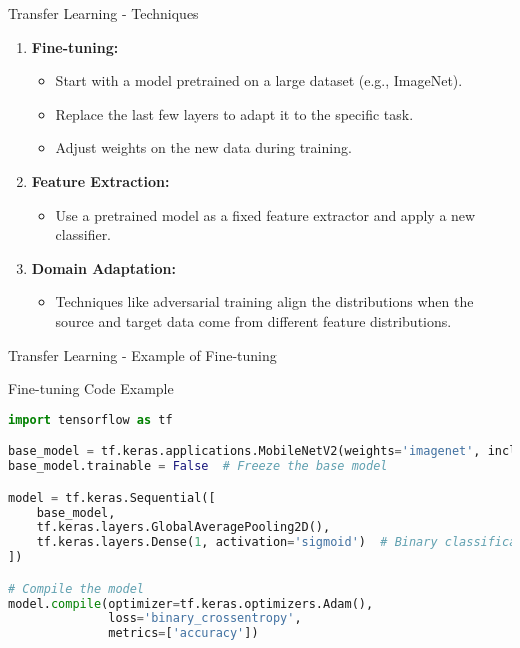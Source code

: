 \documentclass[aspectratio=169]{beamer}
\begin{document}
\begin{frame}[fragile]{Transfer Learning - Techniques}
    \begin{enumerate}
        \item \textbf{Fine-tuning:}
        \begin{itemize}
            \item Start with a model pretrained on a large dataset (e.g., ImageNet).
            \item Replace the last few layers to adapt it to the specific task.
            \item Adjust weights on the new data during training.
        \end{itemize}
        \item \textbf{Feature Extraction:}
        \begin{itemize}
            \item Use a pretrained model as a fixed feature extractor and apply a new classifier.
        \end{itemize}
        \item \textbf{Domain Adaptation:}
        \begin{itemize}
            \item Techniques like adversarial training align the distributions when the source and target data come from different feature distributions.
        \end{itemize}
    \end{enumerate}
\end{frame}

\begin{frame}[fragile]{Transfer Learning - Example of Fine-tuning}
    \begin{block}{Fine-tuning Code Example}
        \begin{lstlisting}[language=Python]
import tensorflow as tf

base_model = tf.keras.applications.MobileNetV2(weights='imagenet', include_top=False)
base_model.trainable = False  # Freeze the base model

model = tf.keras.Sequential([
    base_model,
    tf.keras.layers.GlobalAveragePooling2D(),
    tf.keras.layers.Dense(1, activation='sigmoid')  # Binary classification
])

# Compile the model
model.compile(optimizer=tf.keras.optimizers.Adam(),
              loss='binary_crossentropy',
              metrics=['accuracy'])
        \end{lstlisting}
    \end{block}
\end{frame}
\end{document}
